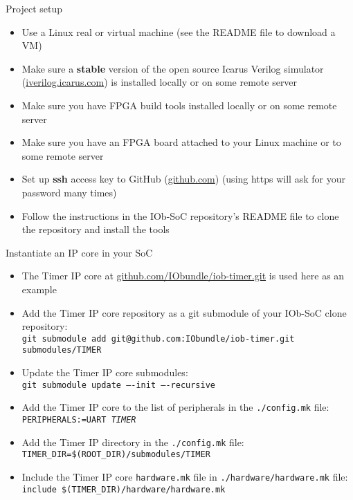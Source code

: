 \documentclass [xcolor=svgnames, t] {beamer}
\begin{document}
\begin{frame}{Project setup}
\begin{center}
  \begin{itemize}
    \item Use a Linux real or virtual machine (see the README file to download a VM)
    \item Make sure a {\bf stable} version of the open source Icarus Verilog simulator (\url{iverilog.icarus.com}) is installed locally or on some remote server
    \item Make sure you have FPGA build tools installed locally or on some remote server
    \item Make sure you have an FPGA board attached to your Linux machine or to some remote server
    \item Set up {\bf ssh} access key to GitHub (\url{github.com}) (using https will ask for your password many times)
    \item Follow the instructions in the IOb-SoC repository's README file to clone the repository and install the tools
  \end{itemize}
\end{center}
\end{frame}


\begin{frame}{Instantiate an IP core in your SoC}
  \begin{itemize}
  \item The Timer IP core at \url{github.com/IObundle/iob-timer.git} is used here as an example
  \item Add the Timer IP core repository as a git submodule of your IOb-SoC clone repository:\\
    {\tt \tiny git submodule add git@github.com:IObundle/iob-timer.git submodules/TIMER}
  \item Update the Timer IP core submodules:\\
    {\tt \tiny git submodule update ----init ----recursive}
  \item Add the Timer IP core to the list of peripherals in the {\tt ./config.mk} file:\\
    {\tt PERIPHERALS:=UART {\em TIMER}}
  \item Add the Timer IP directory in the {\tt ./config.mk} file:\\
    {\tt \tiny TIMER\_DIR=\$(ROOT\_DIR)/submodules/TIMER}
  \item Include the Timer IP core {\tt hardware.mk} file in {\tt ./hardware/hardware.mk} file:\\
    {\tt \tiny include \$(TIMER\_DIR)/hardware/hardware.mk}
  \end{itemize}
\end{frame}
\end{document}
